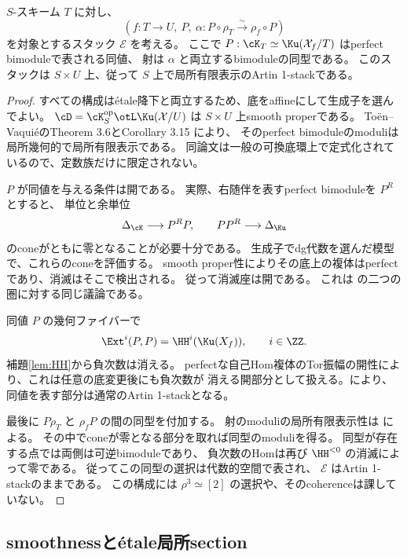 \begin{proposition}\label{prop:equivalence-stack}
 \(S\)-スキーム \(T\) に対し、
 \[
 (f:T\to U,\ P,\ \alpha:P\circ\rho_T\xrightarrow{\sim}\rho_f\circ P)
 \]
 を対象とするスタック \(\mathcal E\) を考える。
 ここで \(P:\cK_T\simeq\Ku(\mathcal X_f/T)\) はperfect bimoduleで表される同値、
 射は \(\alpha\) と両立するbimoduleの同型である。
 このスタックは \(S\times U\) 上、従って \(S\) 上で局所有限表示のArtin 1-stackである。
\end{proposition}
\begin{proof}
 すべての構成はétale降下と両立するため、底をaffineにして生成子を選んでよい。
 \(\cD=\cK_S^{\mathrm{op}}\otL\Ku(\mathcal X/U)\) は \(S\times U\) 上smooth properである。
 Toën--VaquiéのTheorem 3.6とCorollary 3.15 \cite{TV}により、
 そのperfect bimoduleのmoduliは局所幾何的で局所有限表示である。
 同論文は一般の可換底環上で定式化されているので、定数族だけに限定されない。

 \(P\) が同値を与える条件は開である。
 実際、右随伴を表すperfect bimoduleを \(P^R\) とすると、
 単位と余単位
 \[
 \Delta_{\cK}\longrightarrow P^R P,
 \qquad PP^R\longrightarrow\Delta_{\Ku}
 \]
 のconeがともに零となることが必要十分である。
 生成子でdg代数を選んだ模型で、これらのconeを評価する。
 smooth proper性によりその底上の複体はperfectであり、消滅はそこで検出される。
 従って消滅座は開である。
 これは \cite[Lemma 3.25とCorollary 3.24の証明]{TV} の二つの圏に対する同じ議論である。

 同値 \(P\) の幾何ファイバーで
 \[
 \Ext^i(P,P)=\HH^i(\Ku(X_f)),\qquad i\in\ZZ.
 \]
 補題\ref{lem:HH}から負次数は消える。
 perfectな自己Hom複体のTor振幅の開性により、これは任意の底変更後にも負次数が
 消える開部分として扱える。\cite[Corollary 3.21]{TV}により、
 同値を表す部分は通常のArtin 1-stackとなる。

 最後に \(P\rho_T\) と \(\rho_fP\) の間の同型を付加する。
 射のmoduliの局所有限表示性は \cite[Corollary 3.19]{TV} による。
 その中でconeが零となる部分を取れば同型のmoduliを得る。
 同型が存在する点では両側は可逆bimoduleであり、
 負次数のHomは再び \(\HH^{<0}\) の消滅によって零である。
 従ってこの同型の選択は代数的空間で表され、
 \(\mathcal E\) はArtin 1-stackのままである。
 この構成には \(\rho^3\simeq[2]\) の選択や、そのcoherenceは課していない。
\end{proof}

\subsection{smoothnessとétale局所section}

